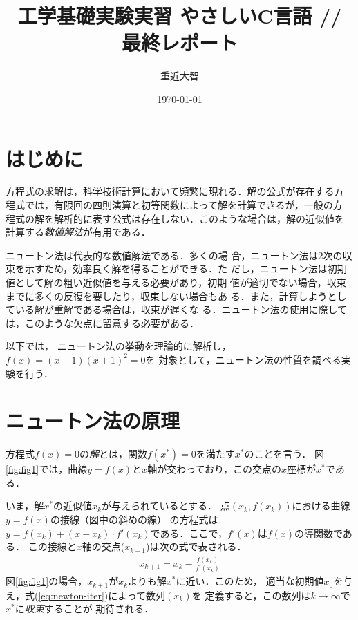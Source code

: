 \documentclass[12pt]{jarticle}
\renewcommand  \[  {\begin{eqnarray}}
\renewcommand  \]  {\end{eqnarray}}
\begin{document}
\title{工学基礎実験実習 やさしいC言語 // 最終レポート}
\date{\today}
\author{重近大智}
\maketitle

\section{はじめに}

方程式の求解は，科学技術計算において頻繁に現れる．解の公式が存在する方
程式では，有限回の四則演算と初等関数によって解を計算できるが，一般の方
程式の解を解析的に表す公式は存在しない．このような場合は，解の近似値を
計算する{\em 数値解法}が有用である．

ニュートン法\cite{numeric,mathwld}は代表的な数値解法である．多くの場
合，ニュートン法は2次の収束を示すため，効率良く解を得ることができる．た
だし，ニュートン法は初期値として解の粗い近似値を与える必要があり，初期
値が適切でない場合，収束までに多くの反復を要したり，収束しない場合もあ
る．また，計算しようとしている解が重解である場合は，収束が遅くな
る．ニュートン法の使用に際しては，このような欠点に留意する必要がある．

以下では， ニュートン法の挙動を理論的に解析し，$f(x)=(x-1)(x+1)^2=0$を
対象として，ニュートン法の性質を調べる実験を行う．


\section{ニュートン法の原理}
\label{sec:bas}

方程式$f(x)=0$の{\em 解}とは，関数$f(x^*)=0$を満たす$x^*$のことを言う．
図\ref{fig:fig1}では，曲線$y=f(x)$と$x$軸が交わっており，この交点の$x$座標が$x^*$である．

いま，解$x^*$の近似値$x_k$が与えられているとする．
点$(x_k,f(x_k))$における曲線$y=f(x)$の接線（図中の斜めの線）
の方程式は$y=f(x_k)+(x-x_k)\cdot f'(x_k)$である．ここで，$f'(x)$は$f(x)$の導関数である．
この接線と$x$軸の交点($x_{k+1}$)は次の式で表される\cite{clo05,mathwld}．
\[
x_{k+1}=x_k-\frac{f(x_k)}{f'(x_k)}
\label{eq:newton-iter}
\]
図\ref{fig:fig1}の場合，$x_{k+1}$が$x_k$よりも解$x^*$に近い．このため，
適当な初期値$x_0$を与え，式(\ref{eq:newton-iter})によって数列$(x_k)$を
定義すると，この数列は$k\rightarrow\infty$で$x^*$に{\em 収束}することが
期待される．
\end{document}
